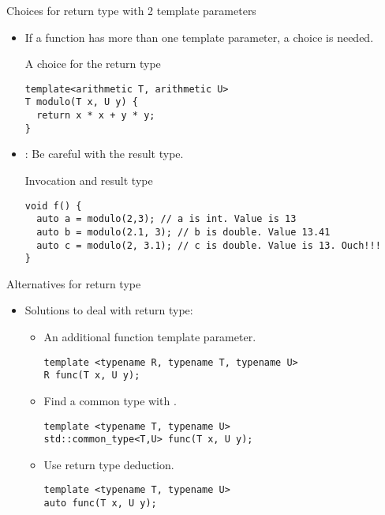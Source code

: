 \begin{frame}[t,fragile]{Choices for return type with 2 template parameters}

\begin{itemize}
  \item If a function has more than one template parameter, a choice is needed.

\begin{block}{A choice for the return type}
\begin{lstlisting}
template<arithmetic T, arithmetic U>
T modulo(T x, U y) {
  return x * x + y * y;
}
\end{lstlisting}
\end{block}

  \item {}: Be careful with the result type.

\begin{block}{Invocation and result type}
\begin{lstlisting}
void f() {
  auto a = modulo(2,3); // a is int. Value is 13
  auto b = modulo(2.1, 3); // b is double. Value 13.41
  auto c = modulo(2, 3.1); // c is double. Value is 13. Ouch!!!
}
\end{lstlisting}
\end{block}

\end{itemize}
\end{frame}

\begin{frame}[t,fragile]{Alternatives for return type}
\begin{itemize}
  \item Solutions to deal with return type:
    \begin{itemize}
      \item An additional function template parameter.
\begin{lstlisting}
template <typename R, typename T, typename U>
R func(T x, U y);
\end{lstlisting}

      \item Find a common type with .
\begin{lstlisting}
template <typename T, typename U>
std::common_type<T,U> func(T x, U y);
\end{lstlisting}

      \item Use return type deduction.
\begin{lstlisting}
template <typename T, typename U>
auto func(T x, U y);
\end{lstlisting}

    \end{itemize}
\end{itemize}
\end{frame}
